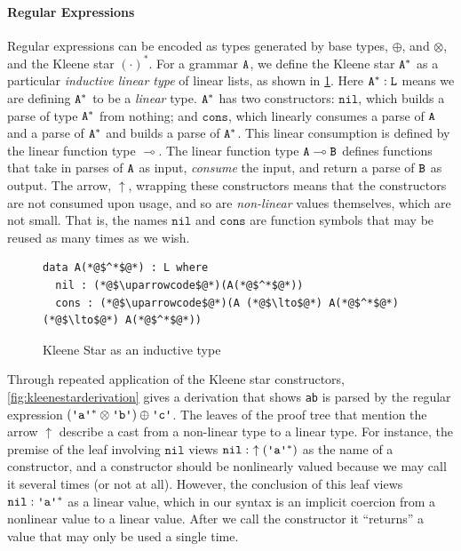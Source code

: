 \documentclass[acmsmall,nonacm]{acmart}
\newcommand{\uparrowcode}{\color{nonlinconstructorcolor} \uparrow}
\newcommand{\lto}{\multimap}
\newcommand{\ltonl}[1]{~\uparrow #1}
\newcommand{\nil}{\texttt{nil}}
\newcommand{\cons}{\texttt{cons}}
\newcommand{\literal}[1]{\texttt{\textquotesingle#1\textquotesingle}}
\newcommand{\stringquote}[1]{\texttt{\textquotedbl#1\textquotedbl}}
\begin{document}
\paragraph{Regular Expressions}
Regular expressions can be encoded as types generated by base types,
$\oplus$, and $\otimes$, and the Kleene star $(\cdot)^{\ast}$.  For a
grammar $\texttt{A}$, we define the Kleene star $\texttt{A}^{*}$ as a particular
\emph{inductive linear type} of linear lists, as shown in
\cref{fig:kleenestarinductive}. Here $\texttt{A}^{*} : \texttt{L}$ means we are defining $\texttt{A}^*$
to be a \emph{linear} type. $\texttt{A}^{*}$ has two constructors: $\nil$, which
builds a parse of type $\texttt{A}^{*}$ from nothing; and $\cons$, which
linearly consumes a parse of $\texttt{A}$ and a parse of $\texttt{A}^{*}$ and builds a
parse of $\texttt{A}^{*}$. This linear consumption is defined by the linear
function type $\lto$. The linear function type $\A \lto \B$ defines functions that
take in parses of $\texttt{A}$ as input, \emph{consume} the input, and return a parse of
$\texttt{B}$ as output. The arrow, $\uparrow$, wrapping these
constructors means that the constructors are not consumed
upon usage, and so are \emph{non-linear} values themselves, which are not small. That is, the
names $\nil$ and $\cons$ are function symbols that may be reused as many times
as we wish.

\begin{figure}
\begin{lstlisting}
data A(*@$^*$@*) : L where
  nil : (*@$\uparrowcode$@*)(A(*@$^*$@*))
  cons : (*@$\uparrowcode$@*)(A (*@$\lto$@*) A(*@$^*$@*) (*@$\lto$@*) A(*@$^*$@*))
\end{lstlisting}
\caption{Kleene Star as an inductive type}
\label{fig:kleenestarinductive}
\end{figure}

Through repeated application of the Kleene star constructors,
\cref{fig:kleenestarderivation} gives a derivation that shows
\stringquote{ab} is parsed by the regular expression $({\literal a}^{*}
\otimes \literal b) \oplus \literal c$. The leaves of the proof tree
that mention the arrow $\uparrow$ describe a cast from a non-linear
type to a linear type.  For instance, the premise of the leaf
involving $\nil$ views $\nil : \ltonl {({\literal a}^{*})}$ as the
name of a constructor, and a constructor should be nonlinearly valued
because we may call it several times (or not at all). However, the
conclusion of this leaf views $\nil : {\literal a}^{*}$ as a linear
value, which in our syntax is an implicit coercion from a nonlinear
value to a linear value. After we call the constructor it ``returns''
a value that may only be used a single time.
\end{document}
